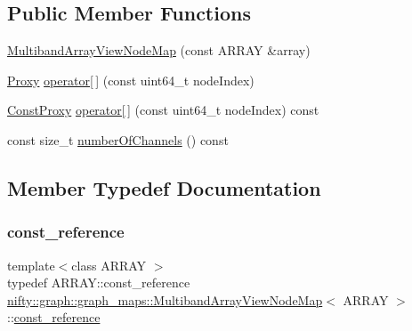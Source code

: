 \subsection*{Public Member Functions}
\begin{DoxyCompactItemize}
\item 
\hyperlink{structnifty_1_1graph_1_1graph__maps_1_1MultibandArrayViewNodeMap_a2a111814be7a923efef4ef2ae44394fd}{Multiband\+Array\+View\+Node\+Map} (const A\+R\+R\+AY \&array)
\item 
\hyperlink{classnifty_1_1graph_1_1graph__maps_1_1MultibandArrayViewNodeMap_1_1Proxy}{Proxy} \hyperlink{structnifty_1_1graph_1_1graph__maps_1_1MultibandArrayViewNodeMap_ae68dc0001670dfa50f3b6dd33e8c8bea}{operator\mbox{[}$\,$\mbox{]}} (const uint64\+\_\+t node\+Index)
\item 
\hyperlink{classnifty_1_1graph_1_1graph__maps_1_1MultibandArrayViewNodeMap_1_1ConstProxy}{Const\+Proxy} \hyperlink{structnifty_1_1graph_1_1graph__maps_1_1MultibandArrayViewNodeMap_a67e6398a0b9bed1c989f964013719e0e}{operator\mbox{[}$\,$\mbox{]}} (const uint64\+\_\+t node\+Index) const
\item 
const size\+\_\+t \hyperlink{structnifty_1_1graph_1_1graph__maps_1_1MultibandArrayViewNodeMap_aad8f2ec2a63b787f2c5b9fd5168ada9e}{number\+Of\+Channels} () const
\end{DoxyCompactItemize}


\subsection{Member Typedef Documentation}
\mbox{\label{structnifty_1_1graph_1_1graph__maps_1_1MultibandArrayViewNodeMap_a9a4da5d4bb0e9439af359184b91bc65b}} 
\subsubsection{\texorpdfstring{const\+\_\+reference}{const\_reference}}
{\footnotesize\ttfamily template$<$class A\+R\+R\+AY $>$ \\
typedef A\+R\+R\+A\+Y\+::const\+\_\+reference \hyperlink{structnifty_1_1graph_1_1graph__maps_1_1MultibandArrayViewNodeMap}{nifty\+::graph\+::graph\+\_\+maps\+::\+Multiband\+Array\+View\+Node\+Map}$<$ A\+R\+R\+AY $>$\+::\hyperlink{structnifty_1_1graph_1_1graph__maps_1_1MultibandArrayViewNodeMap_a9a4da5d4bb0e9439af359184b91bc65b}{const\+\_\+reference}}

